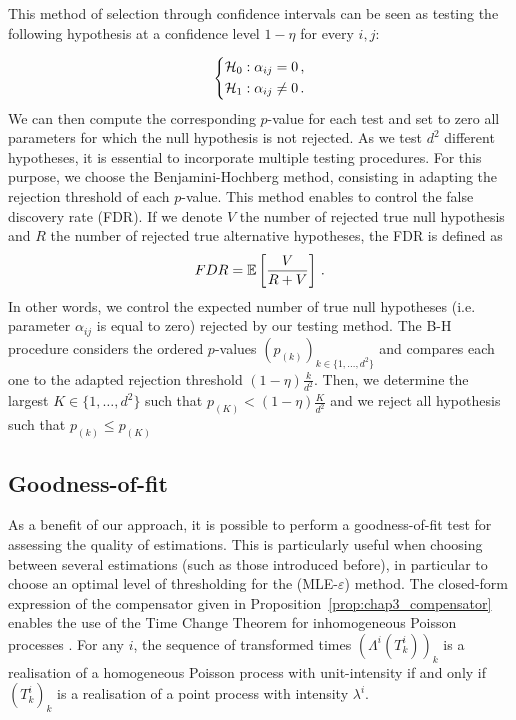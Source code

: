    This method of selection through confidence intervals can be seen as testing the following hypothesis at a confidence level $1-\eta$ for every $i,j$:
   
   \[
   \begin{dcases}
       \mathcal{H}_0 : \alpha_{ij} = 0 \,,\\
       \mathcal{H}_1 : \alpha_{ij} \neq 0\,.
   \end{dcases}
   \]
   We can then compute the corresponding $p$-value for each test and set to zero all parameters for which the null hypothesis is not rejected. As we test $d^2$ different hypotheses, it is essential to incorporate multiple testing procedures. For this purpose, we choose the Benjamini-Hochberg method, consisting in adapting the rejection threshold of each $p$-value. This method enables to control the false discovery rate (FDR). If we denote $V$ the number of rejected true null hypothesis and $R$ the number of rejected true alternative hypotheses, the FDR is defined as \[FDR = {\mathbb E}\left[\frac{V}{R+V}\right]\,.\] In other words, we control the expected number of true null hypotheses (i.e. parameter $\alpha_{ij}$ is equal to zero) rejected by our testing method. The B-H procedure considers the ordered $p$-values $(p_{(k)})_{k\in\{1, \ldots, d^2\}}$ and compares each one to the adapted rejection threshold $(1-\eta) \frac{k}{d^2}$. Then, we determine the largest $K\in\{1, \ldots, d^2\}$ such that $p_{(K)} < (1-\eta) \frac{K}{d^2}$ and we reject all hypothesis such that $p_{(k)} \leq p_{(K)}$

  \subsection{Goodness-of-fit}\label{sec:chap3_goodness}
    As a benefit of our approach, it is possible to perform a goodness-of-fit test for assessing the quality of estimations. This is particularly useful when choosing between several estimations (such as those introduced before), in particular to choose an optimal level of thresholding for the (MLE-$\varepsilon$) method.
    The closed-form expression of the compensator given in Proposition~\ref{prop:chap3_compensator} enables the use of the Time Change Theorem for inhomogeneous Poisson processes \cite[Proposition 7.4.IV]{DaleyV1}.
    For any $i$, the sequence of transformed times $(\Lambda^i(T_k^i))_k$ is a realisation of a homogeneous Poisson process with unit-intensity if and only if $(T_k^i)_k$ is a realisation of a point process with intensity $\lambda^i$.

